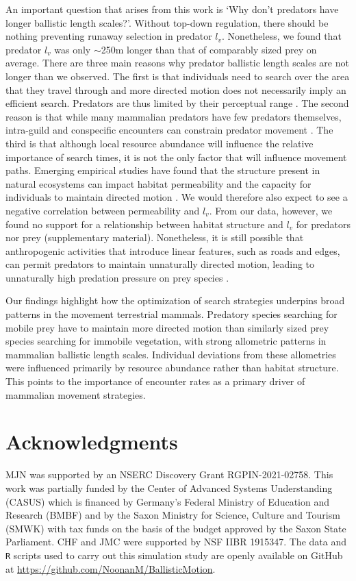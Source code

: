 \documentclass[12pt]{article}
\begin{document}
An important question that arises from this work is `Why don't predators have longer ballistic length scales?'. Without top-down regulation, there should be nothing preventing runaway selection in predator $l_v$. Nonetheless, we found that predator $l_v$ was only $\sim$250m longer than that of comparably sized prey on average. There are three main reasons why predator ballistic length scales are not longer than we observed. The first is that individuals need to search over the area that they travel through and more directed motion does not necessarily imply an efficient search. Predators are thus limited by their perceptual range \cite{Visser:2006,Martinez:2020}. The second reason is that while many mammalian predators have few predators themselves, intra-guild and conspecific encounters can constrain predator movement \cite{Alonso:2002}. The third is that although local resource abundance will influence the relative importance of search times, it is not the only factor that will influence movement paths. Emerging empirical studies have found that the structure present in natural ecosystems can impact habitat permeability and the capacity for individuals to maintain directed motion \cite{Dickie:2017, Medici:2022}. We would therefore also expect to see a negative correlation between permeability and $l_v$. From our data, however, we found no support for a relationship between habitat structure and $l_v$ for predators nor prey (supplementary material). Nonetheless, it is still possible that anthropogenic activities that introduce linear features, such as roads and edges, can permit predators to maintain unnaturally directed motion, leading to unnaturally high predation pressure on prey species \cite{Dickie:2017}.

Our findings highlight how the optimization of search strategies underpins broad patterns in the movement terrestrial mammals. Predatory species searching for mobile prey have to maintain more directed motion than similarly sized prey species searching for immobile vegetation, with strong allometric patterns in mammalian ballistic length scales. Individual deviations from these allometries were influenced primarily by resource abundance rather than habitat structure. This points to the importance of encounter rates as a primary driver of mammalian movement strategies.








\section*{Acknowledgments}
MJN was supported by an NSERC Discovery Grant RGPIN-2021-02758. This work was partially funded by the Center of Advanced Systems Understanding (CASUS) which is financed by Germany’s Federal Ministry of Education and Research (BMBF) and by the Saxon Ministry for Science, Culture and Tourism (SMWK) with tax funds on the basis of the budget approved by the Saxon State Parliament. CHF and JMC were supported by NSF IIBR 1915347. The data and \texttt{R} scripts used to carry out this simulation study are openly available on GitHub at \url{https://github.com/NoonanM/BallisticMotion}.
\end{document}
